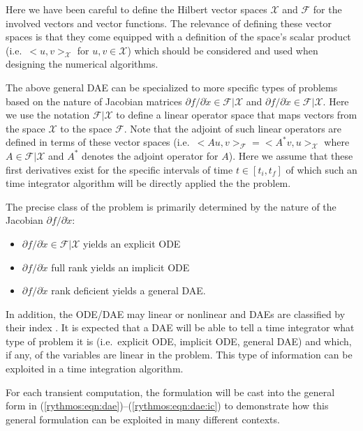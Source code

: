 \documentclass[pdf,ps2pdf,11pt]{SANDreport}
\begin{document}
Here we have been careful to define the Hilbert vector spaces $\mathcal{X}$
and $\mathcal{F}$ for the involved vectors and vector functions.  The
relevance of defining these vector spaces is that they come equipped with a
definition of the space's scalar product (i.e.\ $<u,v>_{\mathcal{X}}$ for
$u,v\in\mathcal{X}$) which should be considered and used when designing the
numerical algorithms.

The above general DAE can be specialized to more specific types of problems
based on the nature of Jacobian matrices ${}\partial f / {}\partial
{}\dot{x}\in\mathcal{F}|\mathcal{X}$ and ${}\partial f / {}\partial
{}\dot{x}\in\mathcal{F}|\mathcal{X}$.  Here we use the notation
$\mathcal{F}|\mathcal{X}$ to define a linear operator space that maps vectors
from the space $\mathcal{X}$ to the space $\mathcal{F}$.  Note that the
adjoint of such linear operators are defined in terms of these vector spaces
(i.e.\ $<A u,v>_{\mathcal{F}} = <A^* v,u>_{\mathcal{X}}$ where
$A\in\mathcal{F}|\mathcal{X}$ and $A^*$ denotes the adjoint operator for $A$).
Here we assume that these first derivatives exist for the specific intervals
of time $t\in[t_i,t_f]$ of which such an time integrator algorithm will be
directly applied the the problem.

The precise class of the problem is primarily determined by the nature of the
Jacobian ${}\partial f / {}\partial {}\dot{x}$:
%
\begin{itemize}
%
{}\item ${}\partial f / {}\partial {}\dot{x} {}\in {}\mathcal{F}|\mathcal{X}$ yields an explicit ODE
%
{}\item ${}\partial f / {}\partial {}\dot{x}$ full rank yields an implicit ODE
%
{}\item ${}\partial f / {}\partial {}\dot{x}$ rank deficient yields a general
DAE.
\end{itemize}
%
In addition, the ODE/DAE may linear or nonlinear and DAEs are classified by
their index \cite{BCP}.  It is expected that a DAE will be able to tell a time
integrator what type of problem it is (i.e.\ explicit ODE, implicit ODE,
general DAE) and which, if any, of the variables are linear in the problem.
This type of information can be exploited in a time integration algorithm.

For each transient computation, the formulation will be cast into the general
form in (\ref{rythmos:eqn:dae})--(\ref{rythmos:eqn:dae:ic}) to demonstrate how
this general formulation can be exploited in many different contexts.
\end{document}
